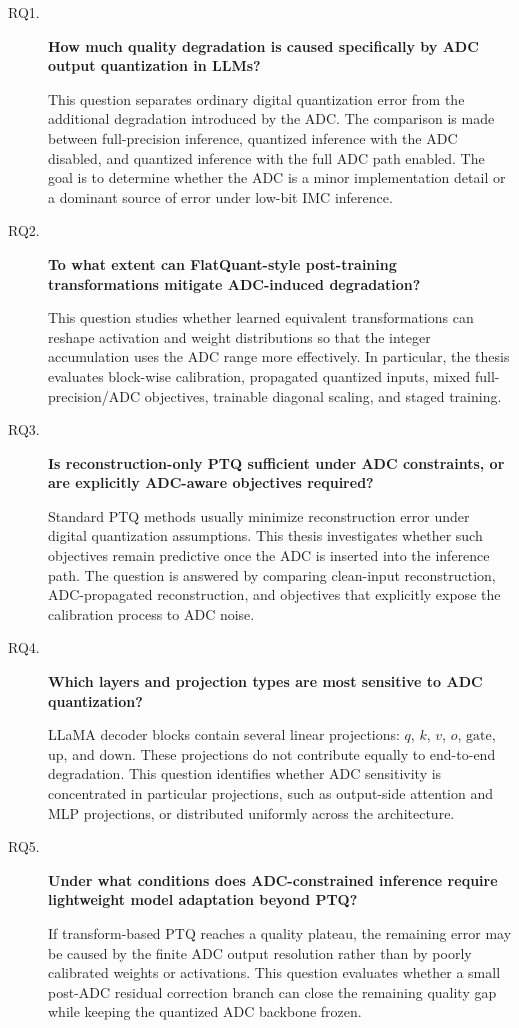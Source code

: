 \documentclass[a4paper,11pt,oneside]{article}
\theoremstyle{breakstyle}
\begin{document}
\begin{description}
    \item[RQ1.]
    \textbf{How much quality degradation is caused specifically by ADC output quantization in LLMs?}

    This question separates ordinary digital quantization error from the additional degradation introduced by the ADC. The comparison is made between full-precision inference, quantized inference with the ADC disabled, and quantized inference with the full ADC path enabled. The goal is to determine whether the ADC is a minor implementation detail or a dominant source of error under low-bit IMC inference.

    \item[RQ2.]
    \textbf{To what extent can FlatQuant-style post-training transformations mitigate ADC-induced degradation?}

    This question studies whether learned equivalent transformations can reshape activation and weight distributions so that the integer accumulation uses the ADC range more effectively. In particular, the thesis evaluates block-wise calibration, propagated quantized inputs, mixed full-precision/ADC objectives, trainable diagonal scaling, and staged training.

    \item[RQ3.]
    \textbf{Is reconstruction-only PTQ sufficient under ADC constraints, or are explicitly ADC-aware objectives required?}

    Standard PTQ methods usually minimize reconstruction error under digital quantization assumptions. This thesis investigates whether such objectives remain predictive once the ADC is inserted into the inference path. The question is answered by comparing clean-input reconstruction, ADC-propagated reconstruction, and objectives that explicitly expose the calibration process to ADC noise.

    \item[RQ4.]
    \textbf{Which layers and projection types are most sensitive to ADC quantization?}

    LLaMA decoder blocks contain several linear projections: \(q\), \(k\), \(v\), \(o\), \(\mathrm{gate}\), \(\mathrm{up}\), and \(\mathrm{down}\). These projections do not contribute equally to end-to-end degradation. This question identifies whether ADC sensitivity is concentrated in particular projections, such as output-side attention and MLP projections, or distributed uniformly across the architecture.

    \item[RQ5.]
    \textbf{Under what conditions does ADC-constrained inference require lightweight model adaptation beyond PTQ?}

    If transform-based PTQ reaches a quality plateau, the remaining error may be caused by the finite ADC output resolution rather than by poorly calibrated weights or activations. This question evaluates whether a small post-ADC residual correction branch can close the remaining quality gap while keeping the quantized ADC backbone frozen.
\end{description}
\end{document}
